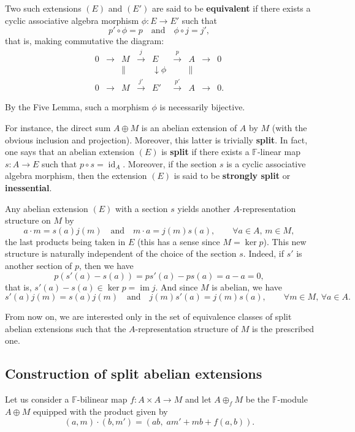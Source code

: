 \documentclass[pdflatex,sn-mathphys-num]{sn-jnl}%
\theoremstyle{thmstyleone}%
\theoremstyle{thmstyletwo}%
\theoremstyle{thmstylethree}%
\begin{document}
Two such extensions $(E)$ and $(E')$ are said to be \textbf{equivalent} if there exists a cyclic associative algebra morphism $\phi: E \to E'$ such that
\[
p' \circ \phi = p \quad \text{and} \quad \phi \circ j = j',
\]
that is, making commutative the diagram:
\[
\begin{array}{ccccccccc}
0 & \longrightarrow & M & \xrightarrow{j} & E & \xrightarrow{p} & A & \longrightarrow & 0 \\
& & \| & & \downarrow{\phi} & & \| & & \\
0 & \longrightarrow & M & \xrightarrow{j'} & E' & \xrightarrow{p'} & A & \longrightarrow & 0.
\end{array}
\]

By the Five Lemma, such a morphism $\phi$ is necessarily bijective.

For instance, the direct sum $A \oplus M$ is an abelian extension of $A$ by $M$ (with the obvious inclusion and projection). Moreover, this latter is trivially \textbf{split}. In fact, one says that an abelian extension $(E)$ is \textbf{split} if there exists a $\mathbb{F}$-linear map $s: A \to E$ such that $p \circ s = \operatorname{id}_A$. Moreover, if the section $s$ is a cyclic associative algebra morphism, then the extension $(E)$ is said to be \textbf{strongly split} or \textbf{inessential}.

Any abelian extension $(E)$ with a section $s$ yields another $A$-representation structure on $M$ by
\[
a \cdot m = s(a) j(m) \quad \text{and} \quad m \cdot a = j(m) s(a), \qquad \forall a \in A, \, m \in M,
\]
the last products being taken in $E$ (this has a sense since $M = \ker p$). This new structure is naturally independent of the choice of the section $s$. Indeed, if $s'$ is another section of $p$, then we have
\[
p(s'(a) - s(a)) = p s'(a) - p s(a) = a - a = 0,
\]
that is, $s'(a) - s(a) \in \ker p = \operatorname{im} j$. And since $M$ is abelian, we have
\[
s'(a) j(m) = s(a) j(m) \quad \text{and} \quad j(m) s'(a) = j(m) s(a), \qquad \forall m \in M, \, \forall a \in A.
\]

From now on, we are interested only in the set of equivalence classes of split abelian extensions such that the $A$-representation structure of $M$ is the prescribed one.

\subsection{Construction of split abelian extensions}

Let us consider a $\mathbb{F}$-bilinear map $f: A \times A \to M$ and let $A \oplus_f M$ be the $\mathbb{F}$-module $A \oplus M$ equipped with the product given by
\begin{equation}\label{1}
(a, m) \cdot (b, m') = (ab, \; a m' + m b + f(a, b)). 
\end{equation}
\end{document}
